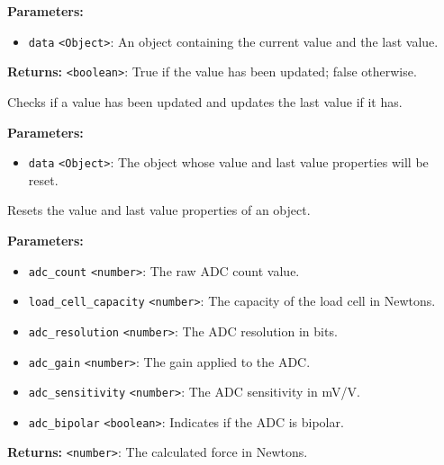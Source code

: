 \documentclass[12pt,a4paper]{article}
\begin{document}
\noindent \textbf{Parameters:}
\begin{itemize}
  \item \texttt{data} \texttt{<Object>}: An object containing the current value and the last value.
\end{itemize}

\noindent \textbf{Returns:} \texttt{<boolean>}: True if the value has been updated; false otherwise.

\noindent Checks if a value has been updated and updates the last value if it has.

\vspace{5mm}
\noindent {}


\noindent \textbf{Parameters:}
\begin{itemize}
  \item \texttt{data} \texttt{<Object>}: The object whose value and last value properties will be reset.
\end{itemize}

\noindent Resets the value and last value properties of an object.

\vspace{5mm}
\noindent {}


\noindent \textbf{Parameters:}
\begin{itemize}
  \item \texttt{adc\_count} \texttt{<number>}: The raw ADC count value.
  \item \texttt{load\_cell\_capacity} \texttt{<number>}: The capacity of the load cell in Newtons.
  \item \texttt{adc\_resolution} \texttt{<number>}: The ADC resolution in bits.
  \item \texttt{adc\_gain} \texttt{<number>}: The gain applied to the ADC.
  \item \texttt{adc\_sensitivity} \texttt{<number>}: The ADC sensitivity in mV/V.
  \item \texttt{adc\_bipolar} \texttt{<boolean>}: Indicates if the ADC is bipolar.
\end{itemize}

\noindent \textbf{Returns:} \texttt{<number>}: The calculated force in Newtons.
\end{document}
